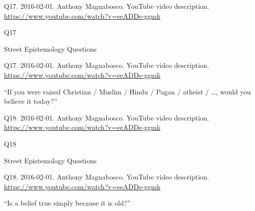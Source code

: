\documentclass[
    src/templates/5x2-on-a4paper,
    frame
]{flashcards}
\newcommand{\myheader}{}
\newcommand{\myfooter}{
    \begin{flushright}
        \small\sc
        Street Epistemology Questions \par
    \end{flushright}
}
\begin{document}
        \renewcommand{\myheader}{
            \normalfont %
            \begin{tiny}
                Q17.
                2016-02-01.
                Anthony Magnabosco.
                    YouTube video description.
                    \\
                    \url{ https://www.youtube.com/watch?v=eeADDe-ggmk }
                \par
            \end{tiny}
        }
        \begin{flashcard}{
            \myheader
            \vspace{\fill}
            \begin{center}
                \large
                    Q17
            \end{center}
            \vspace{\fill}
            \myfooter
            \vspace{-1.4ex}
        }
            \myheader
            \vspace{\fill}
            \begin{center}
                \large
\enquote{If you were raised Christian / Muslim / Hindu / Pagan / atheist / …, would you believe it today?}            \end{center}
            \vspace{\fill}
        \end{flashcard}
        \renewcommand{\myheader}{
            \normalfont %
            \begin{tiny}
                Q18.
                2016-02-01.
                Anthony Magnabosco.
                    YouTube video description.
                    \\
                    \url{ https://www.youtube.com/watch?v=eeADDe-ggmk }
                \par
            \end{tiny}
        }
        \begin{flashcard}{
            \myheader
            \vspace{\fill}
            \begin{center}
                \large
                    Q18
            \end{center}
            \vspace{\fill}
            \myfooter
            \vspace{-1.4ex}
        }
            \myheader
            \vspace{\fill}
            \begin{center}
                \large
\enquote{Is a belief true simply because it is old?}            \end{center}
            \vspace{\fill}
        \end{flashcard}
\end{document}
